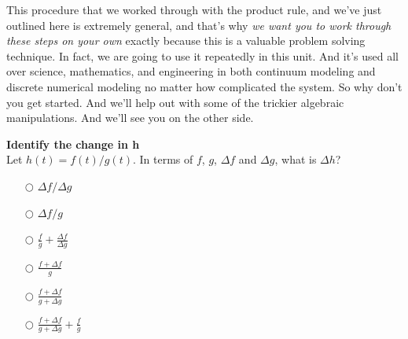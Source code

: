 \documentclass[pdftex, brazil, 12pt, twoside]{article}
\begin{document}
\begin{figure}[H]
  \begin{center}
  \end{center}
\end{figure}

This procedure that we worked through with the product rule,
and we've just outlined here is extremely general,
and that's why \emph{we want you to work
through these steps on your own} exactly because this
is a valuable problem solving technique.
In fact, we are going to use it repeatedly in this unit.
And it's used all over science, mathematics, and engineering
in both continuum modeling and discrete numerical modeling
no matter how complicated the system.
So why don't you get started.
And we'll help out with some of the trickier algebraic
manipulations. And we'll see you on the other side.

\begin{exercise}
  \textbf{Identify the change in h}\\%
  Let $h(t) = f(t)/g(t)$. In terms of $f$, $g$, $\Delta f$ and $\Delta g$,
  what is $\Delta h$?
  \begin{itemize}
  \item[$\bigcirc$] $\Delta f / \Delta g$
  \item[$\bigcirc$] $\Delta f / g$
  \item[$\bigcirc$] $\frac{f}{g} + \frac{\Delta f}{\Delta g}$
  \item[$\bigcirc$] $\frac{f + \Delta f}{g}$
  \item[$\bigcirc$] $\frac{f + \Delta f}{g + \Delta g}$
  \item[$\bigcirc$] $\frac{f + \Delta f}{g + \Delta g} + \frac{f}{g}$
  \end{itemize}
\end{exercise}
\end{document}
